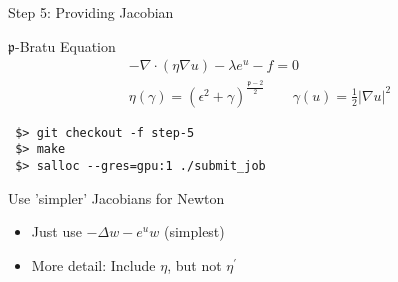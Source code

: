 



\begin{frame}[fragile]{Step 5: Providing Jacobian}

  \begin{block}{$\mathfrak{p}$-Bratu Equation}
    \begin{gather*}
      -\nabla \cdot (\eta \nabla u) - \lambda e^u - f = 0 \\
      \eta(\gamma) = (\epsilon^2 + \gamma)^{\frac{\mathfrak{p}-2}{2}} \qquad \gamma(u) = \frac{1}{2} \vert\nabla u\vert^2
    \end{gather*}

 \begin{lstlisting}
 $> git checkout -f step-5
 $> make
 $> salloc --gres=gpu:1 ./submit_job
 \end{lstlisting}
  \end{block}

  \begin{block}{Use 'simpler' Jacobians for Newton}
    \begin{itemize}
     \item Just use $-\Delta w  - e^u w$ (simplest)
     \item More detail: Include $\eta$, but not $\eta^\prime$
    \end{itemize}

  \end{block}

\end{frame}


